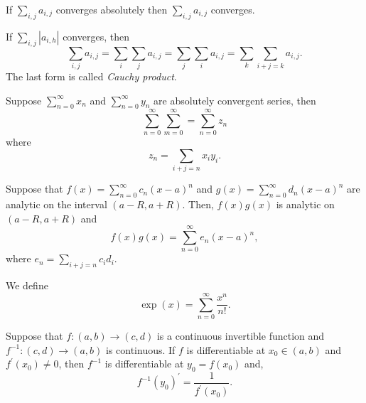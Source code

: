 \documentclass[twoside]{article}
\begin{document}
\begin{theorem}
    If $\sum_{i,j} a_{i,j}$ converges absolutely then $\sum_{i,j} a_{i,j}$ converges.
\end{theorem}

\begin{theorem}
    If $\sum_{i,j} |a_{i,h}|$ converges, then 
    \begin{equation*}
        \sum_{i,j} a_{i,j} = \sum_{i}\sum_{j} a_{i,j}
        = \sum_{j}\sum_{i} a_{i, j} = \sum_{k}\sum_{i+j=k} a_{i,j}.
    \end{equation*}
    The last form is called \textit{Cauchy product}.
\end{theorem}

\begin{definition}
    Suppose $\sum_{n = 0}^{\infty}x_{n}$ and $\sum_{n = 0}^{\infty}y_{n}$ are
    absolutely convergent series, then 
    \begin{equation*}
        \sum_{n=0}^{\infty}\sum_{m=0}^{\infty} = \sum_{n=0}^{\infty}z_{n}
    \end{equation*}
    where
    \begin{equation*}
        z_{n} = \sum_{i+j = n} x_{i}y_{i}.
    \end{equation*}
\end{definition}

\begin{theorem}
    Suppose that $f(x) = \sum_{n = 0}^{\infty}c_{n}(x - a)^{n}$ and $g(x) = \sum_{n=0}^{\infty}d_{n}(x-a)^{n}$
    are analytic on the interval $(a - R, a + R)$. Then, $f(x)g(x)$ is analytic
    on $(a - R, a + R)$ and 
    \begin{equation*}
        f(x)g(x) = \sum_{n = 0}^{\infty}e_{n}(x-a)^{n},
    \end{equation*}
    where $e_{n} = \sum_{i + j = n}c_{i}d_{i}$.
\end{theorem}

\begin{definition}
    We define 
    \begin{equation*}
        \exp(x) = \sum_{n = 0}^{\infty}\frac{x^{n}}{n!}.
    \end{equation*}
\end{definition}

\begin{theorem}
    Suppose that $f : (a,b) \to (c,d)$ is a continuous invertible function 
    and $f^{-1} : (c,d) \to (a,b)$ is continuous. If $f$ is differentiable
    at $x_{0} \in (a,b)$ and $f^{\prime}(x_{0}) \neq 0$, then 
    $f^{-1}$ is differentiable at $y_{0} = f(x_{0})$ and,
    \begin{equation*}
        f^{-1}(y_{0})^{\prime} = \frac{1}{f^{\prime}(x_{0})}.
    \end{equation*}
\end{theorem}
\end{document}
